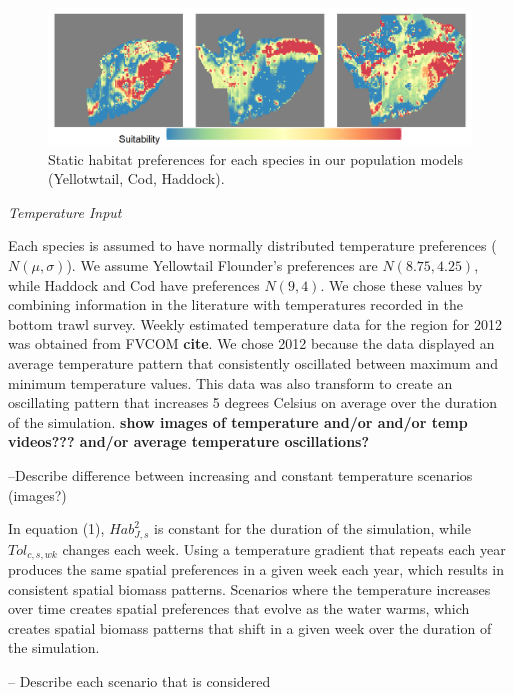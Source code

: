 \documentclass[
]{article}
\begin{document}
\begin{figure}

{\centering \includegraphics[width=0.95\linewidth]{Images/Habitat_3species} 

}

\caption{Static habitat preferences for each species in our population models (Yellotwtail, Cod, Haddock).}\label{fig:hab-plot}
\end{figure}

\emph{Temperature Input}

Each species is assumed to have normally distributed temperature preferences (\(N(\mu,\sigma)\)). We assume Yellowtail Flounder's preferences are \(N(8.75,4.25)\), while Haddock and Cod have preferences \(N(9,4)\). We chose these values by combining information in the literature with temperatures recorded in the bottom trawl survey. Weekly estimated temperature data for the region for 2012 was obtained from FVCOM \textbf{cite}. We chose 2012 because the data displayed an average temperature pattern that consistently oscillated between maximum and minimum temperature values. This data was also transform to create an oscillating pattern that increases 5 degrees Celsius on average over the duration of the simulation. \textbf{show images of temperature and/or and/or temp videos??? and/or average temperature oscillations?}

--Describe difference between increasing and constant temperature scenarios (images?)

In equation (1), \(Hab^2_{J,s}\) is constant for the duration of the simulation, while \(Tol_{c,s,wk}\) changes each week. Using a temperature gradient that repeats each year produces the same spatial preferences in a given week each year, which results in consistent spatial biomass patterns. Scenarios where the temperature increases over time creates spatial preferences that evolve as the water warms, which creates spatial biomass patterns that shift in a given week over the duration of the simulation.

-- Describe each scenario that is considered
\end{document}

